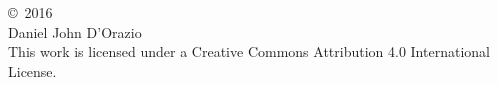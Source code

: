 \vspace*{7in}

\noindent

{
	\pagestyle{empty}
	
	\begin{center}
		\copyright\, 2016 \\
		Daniel John D'Orazio \\
		This work is licensed under a Creative Commons Attribution 4.0 International License.
	\end{center}
}
\clearpage
